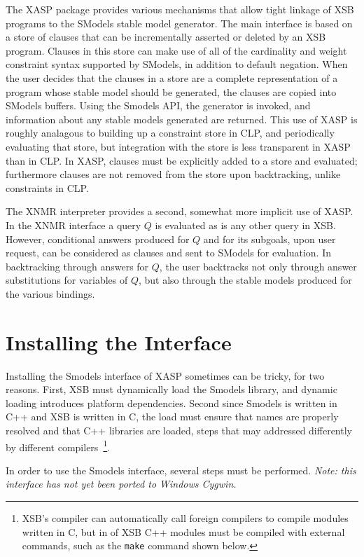 The XASP package provides various mechanisms that allow tight linkage
of XSB programs to the SModels \cite{smodels:engine} stable model
generator.  The main interface is based on a store of clauses that can
be incrementally asserted or deleted by an XSB program.  Clauses in
this store can make use of all of the cardinality and weight
constraint syntax supported by SModels, in addition to default
negation.  When the user decides that the clauses in a store are a
complete representation of a program whose stable model should be
generated, the clauses are copied into SModels buffers.  Using the
Smodels API, the generator is invoked, and information about any
stable models generated are returned.  This use of XASP is roughly
analagous to building up a constraint store in CLP, and periodically
evaluating that store, but integration with the store is less
transparent in XASP than in CLP.  In XASP, clauses must be explicitly
added to a store and evaluated; furthermore clauses are not removed
from the store upon backtracking, unlike constraints in CLP.

The XNMR interpreter provides a second, somewhat more implicit use of
XASP.  In the XNMR interface a query $Q$ is evaluated as is any other
query in XSB.  However, conditional answers produced for $Q$ and for
its subgoals, upon user request, can be considered as clauses and sent
to SModels for evaluation.  In backtracking through answers for $Q$,
the user backtracks not only through answer substitutions for
variables of $Q$, but also through the stable models produced for the
various bindings. 

\section{Installing the Interface}

Installing the Smodels interface of XASP sometimes can be tricky, for
two reasons.  First, XSB must dynamically load the Smodels library,
and dynamic loading introduces platform dependencies.  Second since
Smodels is written in C++ and XSB is written in C, the load must
ensure that names are properly resolved and that C++ libraries are
loaded, steps that may addressed differently by different
compilers~\footnote{XSB's compiler can automatically call foreign
  compilers to compile modules written in C, but in \version{} of XSB
  C++ modules must be compiled with external commands, such as the
  {\tt make} command shown below.}.

In order to use the Smodels interface, several steps must be
performed.  {\em Note: this interface has not yet been ported to Windows
Cygwin.}


